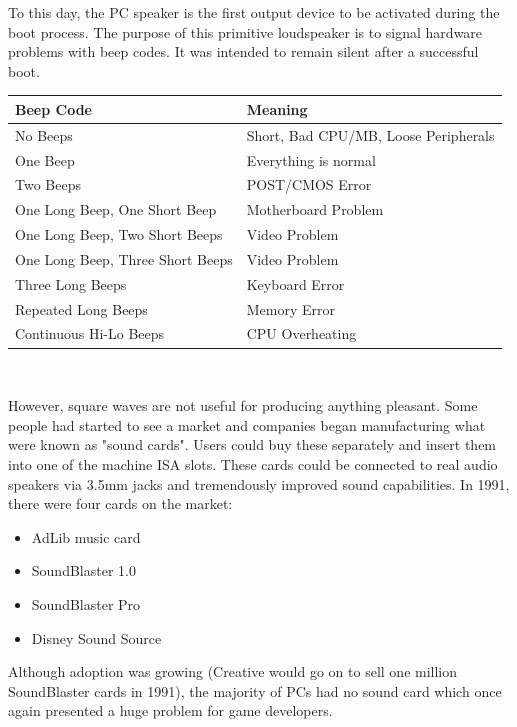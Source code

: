 \documentclass[book.tex]{subfiles}
\begin{document}
\par
 To this day, the PC speaker is the first output device to be activated during the boot process. The purpose of this primitive loudspeaker is to signal hardware problems with beep codes. It was intended to remain silent after a successful boot.\\
\par
\begin{tabularx}{\textwidth}{l l}
\textbf{Beep Code} & \textbf{Meaning}  \\ \hline
No Beeps                         & Short, Bad CPU/MB, Loose Peripherals \\ \hline
One Beep                         & Everything is normal\\ \hline
Two Beeps                        & POST/CMOS Error \\ \hline 
One Long Beep, One Short Beep    & Motherboard Problem \\ \hline
One Long Beep, Two Short Beeps   & Video Problem \\ \hline
One Long Beep, Three Short Beeps & Video Problem \\ \hline
Three Long Beeps                 & Keyboard Error \\ \hline
Repeated Long Beeps              & Memory Error \\ \hline
Continuous Hi-Lo Beeps           & CPU Overheating \\ \hline
\end{tabularx}\\
\bigskip
\par
However, square waves are not useful for producing anything pleasant. Some people had started to see a market and companies began manufacturing what were known as "sound cards". Users could buy these separately and insert them into one of the machine ISA slots. These cards could be connected to real audio speakers via 3.5mm jacks and tremendously improved sound capabilities. In 1991, there were four cards on the market:\\
\par
\begin{itemize}
\item AdLib music card
\item SoundBlaster 1.0
\item SoundBlaster Pro
\item Disney Sound Source
\end{itemize}
\par
Although adoption was growing (Creative would go on to sell one million SoundBlaster cards in 1991), the majority of PCs had no sound card which once again presented a huge problem for game developers.
\end{document}
